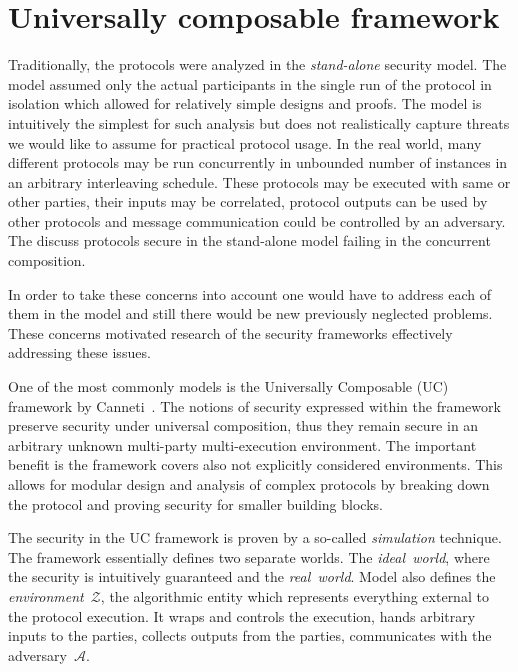 \documentclass[
  digital, %
  twoside, %
  table,   %
  lof,     %
  lot,     %
]{fithesis3}
\begin{document}
\section{Universally composable framework}%
\label{sec:uc}
Traditionally, the protocols were analyzed in the \emph{stand-alone} security model. The model assumed only the actual participants in the single run of the protocol in isolation which allowed for relatively simple designs and proofs. The model is intuitively the simplest for such analysis but does not realistically capture threats we would like to assume for practical protocol usage. In the real world, many different protocols may be run concurrently in unbounded number of instances in an arbitrary interleaving schedule. These protocols may be executed with same or other parties, their inputs may be correlated, protocol outputs can be used by other protocols and message communication could be controlled by an adversary. The \cite{Can06, Can13} discuss protocols secure in the stand-alone model failing in the concurrent composition.

In order to take these concerns into account one would have to address each of them in the model and still there would be new previously neglected problems. These concerns motivated research of the security frameworks effectively addressing these issues.

One of the most commonly models is the Universally Composable (UC) framework by Canneti~\cite{Can01}. The notions of security expressed within the framework preserve security under universal composition, thus they remain secure in an arbitrary unknown multi-party multi-execution environment. The important benefit is the framework covers also not explicitly considered environments. This allows for modular design and analysis of complex protocols by breaking down the protocol and proving security for smaller building blocks.

The security in the UC framework is proven by a so-called \emph{simulation} technique.
The framework essentially defines two separate worlds. The \emph{ideal~world}, where the security is intuitively guaranteed and the \emph{real~world}.
Model also defines the \emph{environment}~$\mathcal{Z}$, the algorithmic entity which represents everything external to the protocol execution. It wraps and controls the execution, hands arbitrary inputs to the parties, collects outputs from the parties, communicates with the adversary~$\mathcal{A}$.
\end{document}
